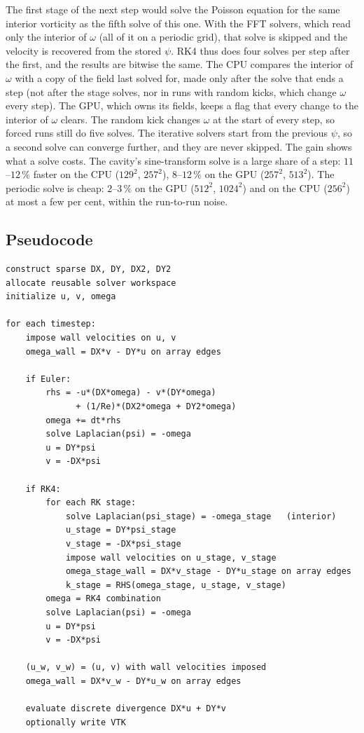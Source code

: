 \documentclass[11pt,a4paper]{article}
\begin{document}
The first stage of the next step would solve the Poisson equation for the same interior vorticity as the fifth solve of this one.  With the FFT solvers, which read only the interior of $\omega$ (all of it on a periodic grid), that solve is skipped and the velocity is recovered from the stored $\psi$.  RK4 thus does four solves per step after the first, and the results are bitwise the same.  The CPU compares the interior of $\omega$ with a copy of the field last solved for, made only after the solve that ends a step (not after the stage solves, nor in runs with random kicks, which change $\omega$ every step).  The GPU, which owns its fields, keeps a flag that every change to the interior of $\omega$ clears.  The random kick changes $\omega$ at the start of every step, so forced runs still do five solves.  The iterative solvers start from the previous $\psi$, so a second solve can converge further, and they are never skipped.  The gain shows what a solve costs.  The cavity's sine-transform solve is a large share of a step: $11$--$12\,\%$ faster on the CPU ($129^2$, $257^2$), $8$--$12\,\%$ on the GPU ($257^2$, $513^2$).  The periodic solve is cheap: $2$--$3\,\%$ on the GPU ($512^2$, $1024^2$) and on the CPU ($256^2$) at most a few per cent, within the run-to-run noise.

\subsection{Pseudocode}

\begin{lstlisting}[language={}]
construct sparse DX, DY, DX2, DY2
allocate reusable solver workspace
initialize u, v, omega

for each timestep:
    impose wall velocities on u, v
    omega_wall = DX*v - DY*u on array edges

    if Euler:
        rhs = -u*(DX*omega) - v*(DY*omega)
              + (1/Re)*(DX2*omega + DY2*omega)
        omega += dt*rhs
        solve Laplacian(psi) = -omega
        u = DY*psi
        v = -DX*psi

    if RK4:
        for each RK stage:
            solve Laplacian(psi_stage) = -omega_stage   (interior)
            u_stage = DY*psi_stage
            v_stage = -DX*psi_stage
            impose wall velocities on u_stage, v_stage
            omega_stage_wall = DX*v_stage - DY*u_stage on array edges
            k_stage = RHS(omega_stage, u_stage, v_stage)
        omega = RK4 combination
        solve Laplacian(psi) = -omega
        u = DY*psi
        v = -DX*psi

    (u_w, v_w) = (u, v) with wall velocities imposed
    omega_wall = DX*v_w - DY*u_w on array edges

    evaluate discrete divergence DX*u + DY*v
    optionally write VTK
\end{lstlisting}
\end{document}
